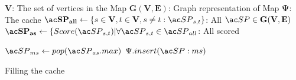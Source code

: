 \begin{algorithm}%
\dontprintsemicolon
\SetVline


\KwData
{

	\hspace{-0.6em}$\mathbf{V}$: The set of vertices in the Map \;
	\hspace{-0.6em}$\mathbf{G(V,E)}$: Graph representation of Map \;
	\hspace{-0.6em}$\mathbf{\Psi}$: The cache \;
	\hspace{-0.6em}$\mathbf{\spath_{all}} \leftarrow \{s \in \mathbf{V}, t \in \mathbf{V}, s \neq t : \spath_{s,t}\}$: All $\spath \in \mathbf{G(V,E)}$ \;
	\hspace{-0.6em}$\mathbf{\spath_{as}} \leftarrow \{Score(\spath_{s,t}) | \forall \spath_{s,t} \in \spath_{all}$: All scored \spaths \;
}


{
	$\spath_{ms} \leftarrow pop(\spath_{as}.max)$  \; 
	{
		$\Psi.insert(\spath:{ms})$\;
	}
}

\caption{Filling the cache}
\label{alg:greedy}
\end{algorithm}